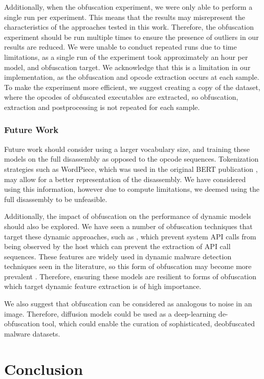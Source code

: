 \documentclass[main.tex]{subfiles}
\begin{document}
Additionally, when the obfuscation experiment, we were only able to perform a single run per experiment. This means that the results may misrepresent the characteristics of the approaches tested in this work. Therefore, the obfuscation experiment should be run multiple times to ensure the presence of outliers in our results are reduced. We were unable to conduct repeated runs due to time limitations, as a single run of the experiment took approximately an hour per model, and obfuscation target. We acknowledge that this is a limitation in our implementation, as the obfuscation and opcode extraction occurs at each sample. To make the experiment more efficient, we suggest creating a copy of the dataset, where the opcodes of obfuscated executables are extracted, so obfuscation, extraction and postprocessing is not repeated for each sample. 

\subsubsection{Future Work}

Future work should consider using a larger vocabulary size, and training these models on the full disassembly as opposed to the opcode sequences. Tokenization strategies such as WordPiece, which was used in the original BERT publication \citep{devlinBERTPretrainingDeep2019a}, may allow for a better representation of the disassembly. We have considered using this information, however due to compute limitations, we deemed using the full disassembly to be unfeasible. 

Additionally, the impact of obfuscation on the performance of dynamic models should also be explored. We have seen a number of obfuscation techniques that target these dynamic approaches, such as \citep{liAPIASONovelAPI2023}, which prevent system API calls from being observed by the host which can prevent the extraction of API call sequences. These features are widely used in dynamic malware detection techniques seen in the literature, so this form of obfuscation may become more prevalent . Therefore, ensuring these models are resilient to forms of obfuscation which target dynamic feature extraction is of high importance. 

We also suggest that obfuscation can be considered as analogous to noise in an image. Therefore, diffusion models could be used as a deep-learning de-obfuscation tool, which could enable the curation of sophisticated, deobfuscated malware datasets. 

\section{Conclusion}
\end{document}
